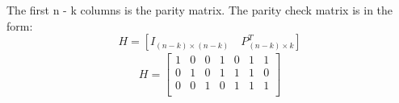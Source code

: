 \documentclass[Main]{subfiles}
\begin{document}
The first n - k columns is the parity matrix.
The parity check matrix is in the form:
\begin{equation}
H = [I_{(n-k) \times (n-k)} \quad P^T_{(n-k) \times k}]
\end{equation}
\begin{align*}
H =
\begin{bmatrix}
1 & 0 & 0 & 1 & 0 & 1 & 1\\
0 & 1 & 0 & 1 & 1 & 1 & 0\\
0 & 0 & 1 & 0 & 1 & 1 & 1\\
\end{bmatrix} \\
\end{align*}
\end{document}
